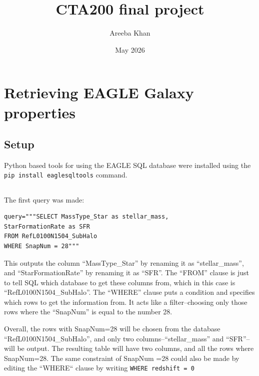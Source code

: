 \documentclass{article}
\title{\Huge CTA200 final project}
\author{Areeba Khan}
\date{May 2026}
\begin{document}
\maketitle

\newpage
\section{ Retrieving EAGLE Galaxy properties} %
\subsection{Setup} %
Python based tools for using the EAGLE SQL database were installed using the \texttt{pip install eaglesqltools} command.
\subsection{} %
The first query was made:
\begin{verbatim}
query="""SELECT MassType_Star as stellar_mass,
StarFormationRate as SFR
FROM RefL0100N1504_SubHalo
WHERE SnapNum = 28"""
\end{verbatim}
This outputs the column ``MassType\_Star'' by renaming it as ``stellar\_mass'', and ``StarFormationRate'' by renaming it as ``SFR''. The ``FROM'' clause is just to tell SQL which database to get these columns from, which in this case is ``RefL0100N1504\_SubHalo''. The ``WHERE'' clause puts a condition and specifies which rows to get the information from. It acts like a filter--choosing only those rows where the ``SnapNum'' is equal to the number 28. 

Overall, the rows with SnapNum=28 will be chosen from the database ``RefL0100N1504\_SubHalo'', and only two columns--``stellar\_mass'' and ``SFR''--will be output. The resulting table will have two columns, and all the rows where SnapNum=28.
The same constraint of SnapNum =28 could also be made by editing the ``WHERE`` clause by writing \texttt{WHERE redshift = 0}
\end{document}
